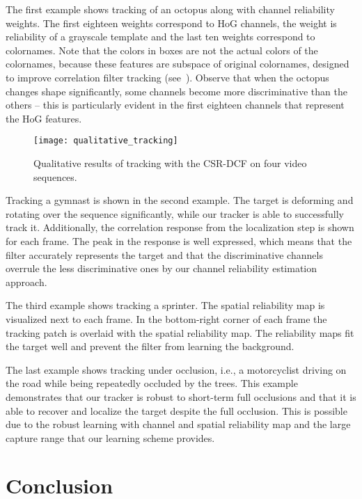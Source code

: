 \documentclass[twocolumn]{article}
\begin{document}
The first example shows tracking of an octopus along with channel reliability weights. The first eighteen weights correspond to HoG channels, the   weight is reliability of a grayscale template and the last ten weights correspond to colornames. Note that the colors in boxes are not the actual colors of the colornames, because these features are subspace of original colornames, designed to improve correlation filter tracking (see~\citep{danelljan2014adaptive}). Observe that when the octopus changes shape significantly, some channels become more discriminative than the others -- this is particularly evident in the first eighteen channels that represent the HoG features.
\begin{figure*}[!t]
\centering
\texttt{[image: qualitative\_tracking]}
\caption{Qualitative results of tracking with the CSR-DCF on four video sequences.}
\label{fig:qualitative}
\end{figure*}

Tracking a gymnast is shown in the second example. The target is deforming and rotating over the sequence significantly, while our tracker is able to successfully track it. Additionally, the correlation response from the localization step is shown for each frame. The peak in the response is well expressed, which means that the filter accurately represents the target and that the discriminative channels overrule the less discriminative ones by our channel reliability estimation approach.

The third example shows tracking a sprinter. The spatial reliability map is visualized next to each frame. In the bottom-right corner of each frame the tracking patch is overlaid with the spatial reliability map. The reliability maps fit the target well and prevent the filter from learning the background.

The last example shows tracking under occlusion, i.e., a motorcyclist driving on the road while being repeatedly occluded by the trees. This example demonstrates that our tracker is robust to short-term full occlusions and that it is able to recover and localize the target despite the full occlusion. This is possible due to the robust learning with channel and spatial reliability map and the large capture range that our learning scheme provides.

\section{Conclusion}  \label{sec:conclusion}
\end{document}
